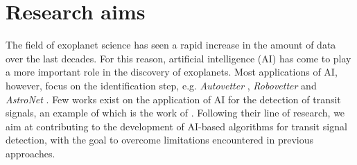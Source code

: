
\section{Research aims}
\label{sec:aims}

The field of exoplanet science has seen a rapid increase in the amount of data over the last decades. For this reason, artificial intelligence (AI) has come to play a more important role in the discovery of exoplanets. Most applications of AI, however, focus on the identification step, e.g. \textit{Autovetter} \citep{catanzarite2015autovetter}, \textit{Robovetter} \citep{coughlin2017planet} and \textit{AstroNet} \citep{shallue2018identifying}. Few works exist on the application of AI for the detection of transit signals, an example of which is the work of \cite{pearson2018searching}. Following their line of research, we aim at contributing to the development of AI-based algorithms for transit signal detection, with the goal to overcome limitations encountered in previous approaches.